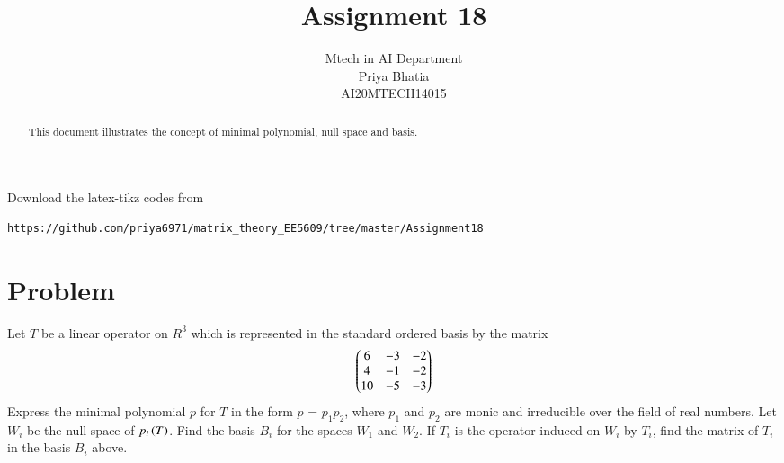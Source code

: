 \documentclass[journal,12pt]{IEEEtran}
\begin{document}
     \def\rightbox#1{\makebox[0in][r]{#1}}
     \def\centbox#1{\makebox[0in]{#1}}
     \def\topbox#1{\raisebox{-\baselineskip}[0in][0in]{#1}}
     \def\midbox#1{\raisebox{-0.5\baselineskip}[0in][0in]{#1}}
\vspace{3cm}
\title{Assignment 18}
\author{Mtech in AI Department\\Priya Bhatia\\AI20MTECH14015}
\maketitle
\bigskip
\renewcommand{\thefigure}{\theenumi}
\renewcommand{\thetable}{\theenumi}
\begin{abstract}
This document illustrates the concept of minimal polynomial, null space and basis.
\end{abstract}
%
Download the latex-tikz codes from 
%
\begin{lstlisting}
https://github.com/priya6971/matrix_theory_EE5609/tree/master/Assignment18
\end{lstlisting}
\section{\textbf{Problem}}
%
Let $T$ be a linear operator on $R^3$ which is represented in the standard ordered basis by the matrix 
\begin{align}
    \begin{pmatrix}6&-3&-2\\
           4&-1&-2\\
           10&-5&-3\end{pmatrix}
\end{align}
Express the minimal polynomial $p$ for $T$ in the form $p$ = $p_1p_2$, where $p_1$ and $p_2$ are monic and irreducible over the field of real numbers. Let $W_i$ be the null space of $p_i\left(T\right)$. Find the basis $B_i$ for the spaces $W_1$ and $W_2$. If $T_i$ is the operator induced on $W_i$ by $T_i$, find the matrix of $T_i$ in the basis $B_i$ above.
%
\end{document}
